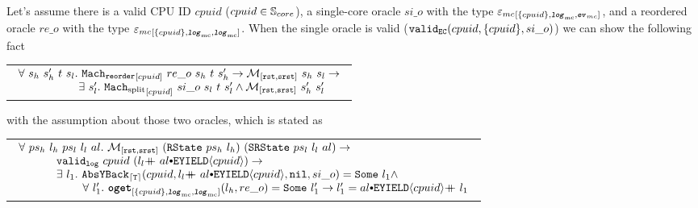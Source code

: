 \begin{lemma}
\label{lemma:chapter:conlink:reorder-refines-split}
%
Let's assume  there is a valid CPU ID $cpuid$ ($cpuid \in {\mathbb{S}_{core}}$),
a single-core oracle $si\_o$ with the type $ {{{\varepsilon_{mc}}}_{[{\{cpuid\}}, {{{\mathrm{\texttt{\textbf{\textit{log}}}}}_{\mathrm{mc}}}}, {{{\mathrm{\texttt{\textbf{\textit{ev}}}}}_{mc}}}]}}$, and a reordered oracle $re\_o$ with the type ${{{\varepsilon_{mc}}}_{[{\{cpuid\}}, {{{\mathrm{\texttt{\textbf{\textit{log}}}}}_{\mathrm{mc}}}}, {{{\mathrm{\texttt{\textbf{\textit{log}}}}}_{\mathrm{mc}}}}]}}$.
When the single oracle is valid ($ {{\mathrm{\texttt{valid}}}_{{\mathrm{\texttt{EC}}}}}({cpuid}, {\{cpuid\}}, {si\_o})$) we can show the following fact
\begin{center}
\begin{tabular}{P{0.95\textwidth}}
$
\begin{array}{l}
\forall \ s_h \ s_h' \ t \ s_l . \ \singlereorderstep{cpuid}{re\_o}{s_h}{t}{s_h'} \rightarrow  \matchrstatesrstate{s_h}{s_l} \rightarrow \\
\ \ \ \ \ \ \ \ \ \ \ \ \ \ \ \ \exists\ s_l' .\ \singlesplitstep{cpuid}{si\_o}{s_l}{t}{s_l'} \wedge  \matchrstatesrstate{s_h'}{s_l'}\\
\end{array}
$
\end{tabular}
\end{center}
with the assumption about those two oracles, which is stated as 
\begin{center}
\begin{tabular}{P{0.95\textwidth}}
$
\begin{array}{l}
\forall \ ps_h \ l_h \ ps_l \ l_l \ al.\ \matchrstatesrstate{(\rstate{ps_h}{l_h})}{(\srstate{ps_l}{l_l}{al})} \rightarrow \\
\ \ \ \ \ \ \ \ \ \ \validlog{cpuid}{(\listconsoppo{\yieldev{cpuid}}{\listappoppo{al}{l_l}})} \rightarrow \\
\ \ \ \ \ \ \ \ \ \ \exists\ l_1. \ \yieldbackfunc{\timebound}{cpuid}{\listconsoppo{\yieldev{cpuid}}{\listappoppo{al}{l_l}}}{\nulllist}{si\_o}{l_1} \wedge \\ 
\ \ \ \ \ \ \ \ \ \ \ \ \ \ \ \ \ \forall \ l_1' .\  \oget{\set{cpuid}}{\mclog}{\mclog}{l_h}{re\_o}{l_1'} \rightarrow  l_1' = \listappoppo{l_1}{\listconsoppo{\yieldev{cpuid}}{al}} \\
\end{array}
$
\end{tabular}
\end{center}

\end{lemma}

